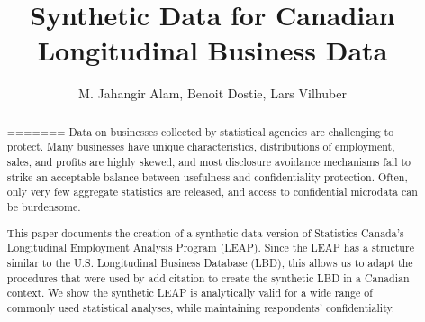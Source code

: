 \documentclass{article}
\title{Synthetic Data for Canadian Longitudinal Business Data }
\author{M. Jahangir Alam, Benoit Dostie, Lars Vilhuber}
\begin{document}
\maketitle
{}
\begin{abstract}
\noindent
=======
Data on businesses collected by statistical agencies are challenging to protect. Many businesses have unique characteristics, distributions of employment, sales, and profits are highly skewed, and  most disclosure avoidance mechanisms  fail to strike an acceptable balance between usefulness and confidentiality protection. Often, only very few aggregate statistics are released, and access to confidential microdata can be burdensome.

This paper documents the creation of a synthetic data version of Statistics Canada's Longitudinal Employment Analysis Program (LEAP). Since the LEAP has a structure similar to the U.S. Longitudinal Business Database (LBD), this allows us to adapt the procedures that were used by {add citation} to create the synthetic LBD in a Canadian context. We show the synthetic LEAP is analytically valid for a wide range of commonly used statistical analyses, while maintaining respondents' confidentiality.


\end{abstract}
\newpage
\tableofcontents
\newpage
\end{document}
